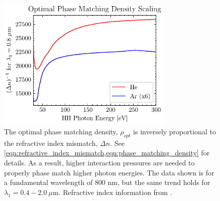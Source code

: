 \begin{figure}
	\centering
	\includegraphics[width=0.75\textwidth]{figures/chap1/recip_deltan_plot.pdf}
	\caption{The optimal phase matching density, $\rho_{opt}$ is inversely proportional to the refractive index mismatch, $\Delta n$. See \cref{eqn:refractive_index_mismatch,eqn:phase_matching_density} for details. As a result, higher interaction pressures are needed to properly phase match higher photon energies. The data shown is for a fundamental wavelength of 800 nm, but the same trend holds for $\lambda_1 = 0.4 - 2.0 \ \mu \textrm{m}$. Refractive index information from \cite{gulliksonCXROXRayInteractions,peckDispersionArgon1964,mansfieldDispersionHelium1969}.}
	\label{fig:recip_deltan_plot}
\end{figure}

